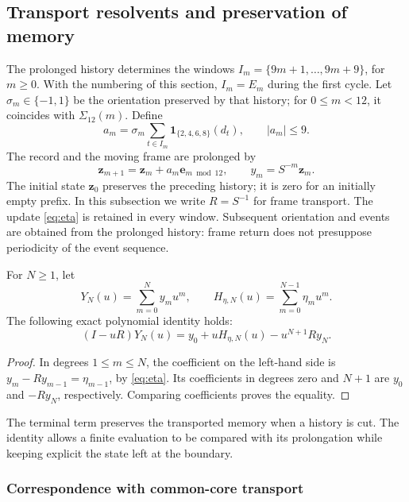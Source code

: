 \subsection{Transport resolvents and preservation of memory}
\label{subsec:ii-memoria-resolvente}

The prolonged history determines the windows
\(I_m=\{9m+1,\ldots,9m+9\}\), for \(m\geq0\).
With the numbering of this section, \(I_m=E_m\) during the first cycle.
Let \(\sigma_m\in\{-1,1\}\) be the orientation preserved by that history;
for \(0\leq m<12\), it coincides with \(\Sigma_{12}(m)\). Define
\[
 a_m=\sigma_m\sum_{t\in I_m}\mathbf1_{\{2,4,6,8\}}(d_t),
 \qquad |a_m|\leq9.
\]
The record and the moving frame are prolonged by
\[
 \mathbf z_{m+1}=\mathbf z_m+a_m\mathbf e_{m\bmod12},\qquad y_m=S^{-m}\mathbf z_m.
\]
The initial state \(\mathbf z_0\) preserves the preceding history; it is zero for
an initially empty prefix. In this subsection we write
\(R=S^{-1}\) for frame transport. The update
\eqref{eq:eta} is retained in every window. Subsequent orientation and events
are obtained from the prolonged history: frame return
does not presuppose periodicity of the event sequence.

\begin{proposition}
For $N\geq1$, let
\[
Y_N(u)=\sum_{m=0}^N y_mu^m,\qquad
H_{\eta,N}(u)=\sum_{m=0}^{N-1}\eta_mu^m.
\]
The following exact polynomial identity holds:
\begin{equation}
(I-uR)Y_N(u)=y_0+uH_{\eta,N}(u)-u^{N+1}Ry_N.
\label{mem:identidad-finita}
\end{equation}
\end{proposition}
\begin{proof}
In degrees $1\leq m\leq N$, the coefficient on the left-hand side is
$y_m-Ry_{m-1}=\eta_{m-1}$, by \eqref{eq:eta}.
Its coefficients in degrees zero and $N+1$ are $y_0$ and $-Ry_N$,
respectively. Comparing coefficients proves the equality.
\end{proof}

The terminal term preserves the transported memory when a history is cut.
The identity allows a finite evaluation to be compared with its prolongation
while keeping explicit the state left at the boundary.

\subsubsection{Correspondence with common-core transport}

